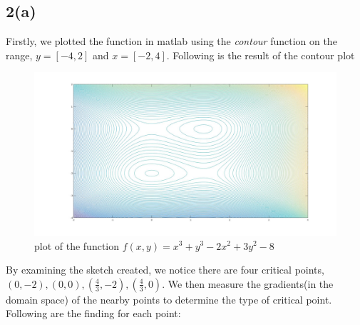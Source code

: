 \documentclass{article}
\begin{document}
\subsection*{2(a)}
Firstly, we plotted the function in matlab using the \textit{contour} function on the range, $y=[-4,2]$ and $x=[-2,4]$. Following is the result of the contour plot
\begin{figure}[H]
\centering
\includegraphics[width=6.5in]{figures/2a.jpg}
\caption{plot of the function $f(x,y) = x^3 + y^3 -2x^2 + 3y^2 - 8$}
\end{figure}
By examining the sketch created, we notice there are four critical points, $(0,-2),(0,0),(\frac{4}{3},-2),(\frac{4}{3},0)$.
We then measure the gradients(in the domain space) of the nearby points to determine the type of critical point. 
Following are the finding for each point:
\end{document}
